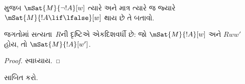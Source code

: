 \documentclass[../../../include/open-logic-section]{subfiles}
\begin{document}
\begin{prob}
   મુજબ
  $\mSat{M}{\lnot !A}[w]$ ત્યારે અને માત્ર ત્યારે જ જ્યારે
  $\mSat{M}{!A \lif \lfalse}[w]$ થાય છે તે બતાવો.
\end{prob}

\begin{prop}
  જગતોમાં સત્યતા~$R$ની દૃષ્ટિએ એકદિશવર્ધી છે: જો
  $\mSat{M}{!A}[w]$ અને $Rww'$ હોય, તો
  $\mSat{M}{!A}[w']$.
\end{prop}

\begin{proof}
  સ્વાધ્યાય.
\end{proof}

\begin{prob}
   સાબિત કરો.
\end{prob}
\end{document}
